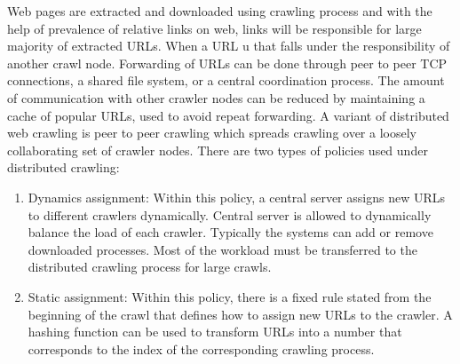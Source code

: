 \documentclass[article,type=msc,colorback,accentcolor=tud9c,twoside,11pt]{tudthesis}
\begin{document}
Web pages are extracted and downloaded using crawling process and with the help of prevalence of relative links on web, links will be responsible for large majority of extracted URLs. When a URL u that falls under the responsibility of another crawl node. Forwarding of URLs can be done through peer to peer TCP connections\cite{Highperformancewebcrawling}, a shared file system\cite{Highperformance}, or a central coordination process\cite{anatomy}. The amount of communication with other crawler nodes can be reduced by maintaining a cache of popular URLs, used to avoid repeat forwarding\cite{Graphstructure}. A variant of distributed web crawling is peer to peer crawling which spreads crawling over a loosely collaborating set of crawler nodes. There are two types of policies used under distributed crawling:
 \begin{enumerate}
	\item Dynamics assignment: Within this policy, a central server assigns new URLs to different crawlers dynamically. Central server is allowed to dynamically balance the load of each crawler. Typically the systems can add or remove downloaded processes. Most of the workload must be transferred to the distributed crawling process for large crawls.
	\item Static assignment: Within this policy, there is a fixed rule stated from the beginning of the crawl that defines how to assign new URLs to the crawler. A hashing function can be used to transform URLs into a number that corresponds to the index of the corresponding crawling process.
\end{enumerate}
\end{document}
